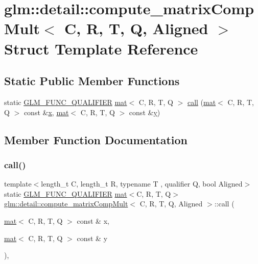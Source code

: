 \hypertarget{structglm_1_1detail_1_1compute__matrix_comp_mult}{}\section{glm\+:\+:detail\+:\+:compute\+\_\+matrix\+Comp\+Mult$<$ C, R, T, Q, Aligned $>$ Struct Template Reference}
\label{structglm_1_1detail_1_1compute__matrix_comp_mult}
\subsection*{Static Public Member Functions}
\begin{DoxyCompactItemize}
\item 
static \hyperlink{setup_8hpp_a33fdea6f91c5f834105f7415e2a64407}{G\+L\+M\+\_\+\+F\+U\+N\+C\+\_\+\+Q\+U\+A\+L\+I\+F\+I\+ER} \hyperlink{structglm_1_1mat}{mat}$<$ C, R, T, Q $>$ \hyperlink{structglm_1_1detail_1_1compute__matrix_comp_mult_a9c27721a9eb38a6ec56d5b321c384b9a}{call} (\hyperlink{structglm_1_1mat}{mat}$<$ C, R, T, Q $>$ const \&\hyperlink{_s_d_l__opengl_8h_ad0e63d0edcdbd3d79554076bf309fd47}{x}, \hyperlink{structglm_1_1mat}{mat}$<$ C, R, T, Q $>$ const \&\hyperlink{_s_d_l__opengl_8h_a1675d9d7bb68e1657ff028643b4037e3}{y})
\end{DoxyCompactItemize}


\subsection{Member Function Documentation}
\mbox{\label{structglm_1_1detail_1_1compute__matrix_comp_mult_a9c27721a9eb38a6ec56d5b321c384b9a}} 
\subsubsection{\texorpdfstring{call()}{call()}}
{\footnotesize\ttfamily template$<$length\+\_\+t C, length\+\_\+t R, typename T , qualifier Q, bool Aligned$>$ \\
static \hyperlink{setup_8hpp_a33fdea6f91c5f834105f7415e2a64407}{G\+L\+M\+\_\+\+F\+U\+N\+C\+\_\+\+Q\+U\+A\+L\+I\+F\+I\+ER} \hyperlink{structglm_1_1mat}{mat}$<$C, R, T, Q$>$ \hyperlink{structglm_1_1detail_1_1compute__matrix_comp_mult}{glm\+::detail\+::compute\+\_\+matrix\+Comp\+Mult}$<$ C, R, T, Q, Aligned $>$\+::call (\begin{DoxyParamCaption}\item[{\hyperlink{structglm_1_1mat}{mat}$<$ C, R, T, Q $>$ const \&}]{x,  }\item[{\hyperlink{structglm_1_1mat}{mat}$<$ C, R, T, Q $>$ const \&}]{y }\end{DoxyParamCaption})\hspace{0.3cm}{\ttfamily [inline]}, {\ttfamily [static]}}



